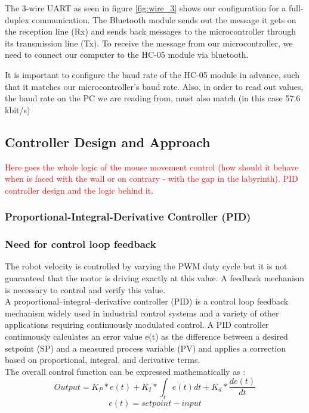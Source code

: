 The 3-wire UART as seen in figure \ref{fig:wire_3} shows our configuration for a full-duplex communication. The Bluetooth module sends out the message it gets on the reception line (Rx) and sends back messages to the microcontroller through its transmission line (Tx). To receive the message from our microcontroller, we need to connect our computer to the HC-05 module via bluetooth.

It is important to configure the baud rate of the HC-05 module in advance, such that it matches our microcontroller's baud rate. Also, in order to read out values, the baud rate on the PC we are reading from, must also match (in this case 57.6 kbit/s)


\subsection{Controller Design and Approach}

\textcolor{red}{
Here goes the whole logic of the mouse movement control (how should it behave when is faced with the wall or on contrary - with the gap in the labyrinth). PID controller design and the logic behind it.
}

\subsubsection{Proportional-Integral-Derivative Controller (PID)}
\subsubsection*{Need for control loop feedback}

The robot velocity is controlled by varying the PWM duty cycle but it is not guaranteed that the motor is driving exactly at this value. A feedback mechanism is necessary to control and verify this value.\\
A proportional–integral–derivative controller (PID) is a control loop feedback mechanism widely used in industrial control systems and a variety of other applications requiring continuously modulated control. A PID controller continuously calculates an error value e(t) as the difference between a desired setpoint (SP) and a measured process variable (PV) and applies a correction based on proportional, integral, and derivative terms.\\
The overall control function can be expressed mathematically as : 
$$Output = K_{P}*e(t) + K_{I}*\int_t e(t) dt + K_{d}*\frac{d e(t)}{dt} $$
$$e(t) = setpoint - input $$
 
